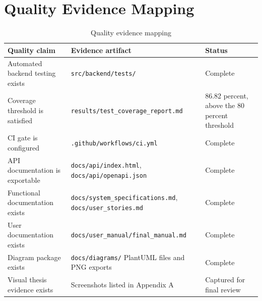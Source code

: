 \section{Quality Evidence Mapping}

\begin{longtable}{|p{}|p{}|p{}|}
\caption{Quality evidence mapping}
\label{tab:quality-evidence}\\
\hline
\textbf{Quality claim} & \textbf{Evidence artifact} & \textbf{Status}\\
\hline
Automated backend testing exists & \texttt{src/backend/tests/} & Complete\\
\hline
Coverage threshold is satisfied & \texttt{results/test\_coverage\_report.md} & 86.82 percent, above the 80 percent threshold\\
\hline
CI gate is configured & \texttt{.github/workflows/ci.yml} & Complete\\
\hline
API documentation is exportable & \texttt{docs/api/index.html}, \texttt{docs/api/openapi.json} & Complete\\
\hline
Functional documentation exists & \texttt{docs/system\_specifications.md}, \texttt{docs/user\_stories.md} & Complete\\
\hline
User documentation exists & \texttt{docs/user\_manual/final\_manual.md} & Complete\\
\hline
Diagram package exists & \texttt{docs/diagrams/} PlantUML files and PNG exports & Complete\\
\hline
Visual thesis evidence exists & Screenshots listed in Appendix A & Captured for final review\\
\hline
\end{longtable}
